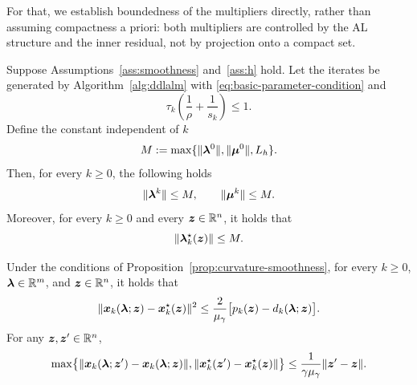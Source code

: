 For that, we establish boundedness of the multipliers directly, rather than assuming compactness a priori: both multipliers are controlled by the AL structure and the inner residual, not by projection onto a compact set.
\begin{lemma}
\label{lem:current-multiplier-boundedness}
Suppose Assumptions~\ref{ass:smoothness} and~\ref{ass:h} hold.
Let the iterates be generated by Algorithm~\ref{alg:ddlalm} with
\eqref{eq:basic-parameter-condition} and
\begin{equation}
\label{eq:multiplier-boundedness-condition}
    \tau_k\left(\frac1\rho+\frac1{s_k}\right)\le1.
\end{equation}
Define the constant independent of $k$
\[
    M:=\max\{\|\bm{\lambda}^0\|,\|\bm{\mu}^0\|,L_h\}.
\]
Then, for every $k\ge0$, the following holds
\[
    \|\bm{\lambda}^k\|\le M,
    \qquad
    \|\bm{\mu}^k\|\le M.
\]
Moreover, for every $k\ge0$ and every $\bm{z}\in\mathbb{R}^n$, it holds that
\[
    \|\bm{\lambda}_k^\star(\bm{z})\|\le M.
\]
\end{lemma}


\begin{lemma}
\label{lem:saddle-center-stability}
Under the conditions of Proposition~\ref{prop:curvature-smoothness}, for every $k\ge0$, $\bm{\lambda}\in\mathbb{R}^m$, and $\bm{z}\in\mathbb{R}^n$, it holds that
\begin{equation}
\label{eq:current-saddle-stability}
\|\bm{x}_k(\bm{\lambda};\bm{z})-\bm{x}_k^\star(\bm{z})\|^2
\le
\frac{2}{\mu_\gamma}
\bigl[p_k(\bm{z})-d_k(\bm{\lambda};\bm{z})\bigr].
\end{equation}
For any $\bm{z},\bm{z}'\in\mathbb{R}^n$,
\begin{equation}
\label{eq:current-center-stability}
\max\bigl\{
\|\bm{x}_k(\bm{\lambda};\bm{z}')-\bm{x}_k(\bm{\lambda};\bm{z})\|,
\|\bm{x}_k^\star(\bm{z}')-\bm{x}_k^\star(\bm{z})\|
\bigr\}
\le\frac{1}{\gamma\mu_\gamma}\|\bm{z}'-\bm{z}\|.
\end{equation}
\end{lemma}

